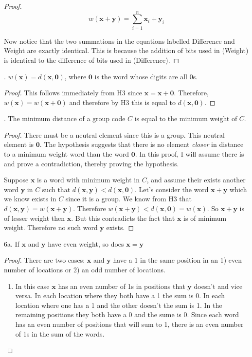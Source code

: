 \documentclass[twoside]{amsart}
\begin{document}
\begin{enumerate}[A.]
\begin{proof}
   \[
      w(\mathbf{x}+\mathbf{y}) = \sum_{i=1}^{n} \mathbf{x}_i+\mathbf{y}_i 
         \tag{Weight}
   \]

   Now notice that the two summations in the equations labelled
   Difference and Weight are exactly identical. This is because
   the addition of bits used in (Weight) is identical to the difference
   of bits used in (Difference).
   \end{proof}

   . $w(\mathbf{x})=d(\mathbf{x},\mathbf{0})$, where
   $\mathbf{0}$ is the word whose digits are all 0s.

   \noindent 
   \begin{proof}This follows immediately from H3 since
   $\mathbf{x}=\mathbf{x}+\mathbf{0}$. Therefore, $w(\mathbf{x})=
   w(\mathbf{x}+\mathbf{0})$ and therefore by H3 this is equal
   to $d(\mathbf{x},\mathbf{0})$.
   \end{proof}

   . The minimum distance of a group code $C$ is equal
   to the minimum weight of $C$. 

   \begin{proof}
   There must be a neutral element since this is a group. This
   neutral element is $\mathbf{0}$. The hypothesis suggests that
   there is no element \emph{closer} in distance to a minimum
   weight word than the word $\mathbf{0}$. In this proof,
   I will assume there is and prove a contradiction, thereby
   proving the hypothesis.

   Suppose $\mathbf{x}$ is a word with minimum weight in $C$, and
   assume their exists another word $\mathbf{y}$ in $C$
   such that $d(\mathbf{x},\mathbf{y}) <
   d(\mathbf{x},\mathbf{0})$.  Let's consider the word
   $\mathbf{x}+\mathbf{y}$ which we know exists in $C$ since it is a group.
   We know from H3 that 
   $d(\mathbf{x},\mathbf{y})=w(\mathbf{x}+\mathbf{y})$. 
   Therefore $w(\mathbf{x}+\mathbf{y}) < d(\mathbf{x},\mathbf{0}) =
   w(\mathbf{x})$. So $\mathbf{x}+\mathbf{y}$ is of lesser weight
   then $\mathbf{x}$. But this contradicts the fact that $\mathbf{x}$
   is of minimum weight. Therefore no such word $\mathbf{y}$ exists.
   \end{proof}

   \noindent 6a. If $\mathbf{x}$ and $\mathbf{y}$ have even weight,
   so does $\mathbf{x}=\mathbf{y}$

   \noindent
   \begin{proof}
   There are two cases:  $\mathbf{x}$ and $\mathbf{y}$ have a 1 in the 
   same position in an 1) even number of locations or 2) an odd number of 
   locations.
   \begin{enumerate}[(1)]
      \item In this case $\mathbf{x}$ has an even number of 1s
      in positions that $\mathbf{y}$ doesn't and vice versa. In
      each location where they both have a 1 the sum is 0. In each location
      where one has a 1 and the other doesn't the sum is 1. In the
      remaining positions they both have a 0 and the sume is 0. Since
      each word has an even number of positions that will sum to 1, there is an
      even number of 1s in the sum of the words.


\end{enumerate}
\end{proof}
\end{enumerate}
\end{document}
